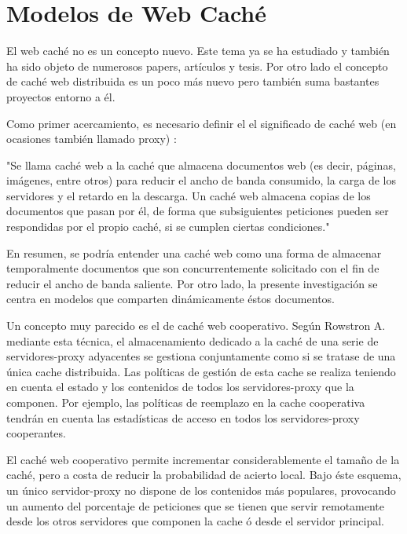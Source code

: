 
\chapter{Modelos de Web Caché} %

\label{ch:modelos_web_caching} %

El web caché no es un concepto nuevo. Este tema ya se ha estudiado y también ha sido objeto de numerosos papers, artículos y tesis. Por otro lado el concepto de caché web distribuida es un poco más nuevo pero también suma bastantes proyectos entorno a él.

Como primer acercamiento, es necesario definir el el significado de caché web (en ocasiones también llamado proxy) \cite{wiki_cacheweb}:

"Se llama caché web a la caché que almacena documentos web (es decir, páginas, imágenes, entre otros) para reducir el ancho de banda consumido, la carga de los servidores y el retardo en la descarga. Un caché web almacena copias de los documentos que pasan por él, de forma que subsiguientes peticiones pueden ser respondidas por el propio caché, si se cumplen ciertas condiciones." 

En resumen, se podría entender una caché web como una forma de almacenar temporalmente documentos que son concurrentemente solicitado con el fin de reducir el ancho de banda saliente. Por otro lado, la presente investigación se centra en modelos que comparten dinámicamente éstos documentos. 

Un concepto muy parecido es el de caché web cooperativo. Según Rowstron A. \cite{rowstron:2001} mediante esta técnica, el almacenamiento dedicado a la caché de una serie de servidores-proxy adyacentes se gestiona conjuntamente como si se tratase de una única cache distribuida. Las políticas de gestión de esta cache se realiza teniendo en cuenta el estado y los contenidos de todos los servidores-proxy que la componen. Por ejemplo, las políticas de reemplazo en la cache cooperativa tendrán en cuenta las estadísticas de acceso en todos los servidores-proxy cooperantes.

El caché web cooperativo permite incrementar considerablemente el tamaño de la caché, pero a costa de
reducir la probabilidad de acierto local. Bajo éste esquema, un único servidor-proxy no dispone de los contenidos más populares, provocando un aumento del porcentaje de peticiones que se tienen que servir remotamente desde los otros servidores que componen la cache ó desde el servidor principal.


